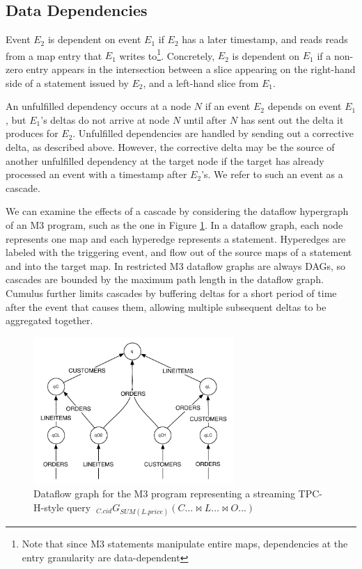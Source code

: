 \documentclass{vldb}
\begin{document}
\subsection{Data Dependencies}
Event $E_2$ is dependent on event $E_1$ if $E_2$ has a later timestamp, and reads reads from a map entry that $E_1$ writes to\footnote{Note that since M3 statements manipulate entire maps, dependencies at the entry granularity are data-dependent}.  Concretely, $E_2$ is dependent on $E_1$ if a non-zero entry appears in the intersection between a slice appearing on the right-hand side of a statement issued by $E_2$, and a left-hand slice from $E_1$.  

An unfulfilled dependency occurs at a node $N$ if an event $E_2$ depends on event $E_1$, but $E_1$'s deltas do not arrive at node $N$ until after $N$ has sent out the delta it produces for $E_2$.  Unfulfilled dependencies are handled by sending out a corrective delta, as described above.  However, the corrective delta may be the source of another unfulfilled dependency at the target node if the target has already processed an event with a timestamp after $E_2$'s.  We refer to such an event as a cascade.

We can examine the effects of a cascade by considering the dataflow hypergraph of an M3 program, such as the one in Figure \ref{fig:dataflow}.  In a dataflow graph, each node represents one map and each hyperedge represents a statement.  Hyperedges are labeled with the triggering event, and flow out of the source maps of a statement and into the target map.  In restricted M3 dataflow graphs are always DAGs, so cascades are bounded by the maximum path length in the dataflow graph.  Cumulus further limits cascades by buffering deltas for a short period of time after the event that causes them, allowing multiple subsequent deltas to be aggregated together.

\begin{figure}
\begin{center}
\includegraphics[width=3in]{graphics/q12_graph}
\end{center}
\caption{Dataflow graph for the M3 program representing a streaming TPC-H-style query $\ _{C.cid}G_{SUM(L.price)}(C\ldots \bowtie L\ldots \bowtie O\ldots)$}
\label{fig:dataflow}
\end{figure} 
\end{document}
